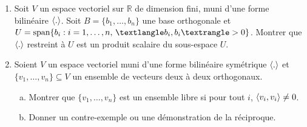 \begin{enumerate}

\item Soit $V$ un espace vectoriel sur $ℝ$ de dimension fini, muni d'une forme bilinéaire $\langle {.} \rangle$. Soit $B = \{b_1,\dots,b_n\}$ une base orthogonale et  $U = \spa \{ b_i :  i=1,\dots,n, \, 〈b_i,b_i〉 >0\}$. Montrer que $\langle {.} \rangle$ restreint à $U$ est un produit scalaire du sous-espace $U$. 
\item Soient $V$ un espace vectoriel muni d'une forme bilinéaire symétrique $\langle {.} \rangle$ et $\{v_1,\dots,v_n\} \subseteq V$ un ensemble de
vecteurs deux à deux orthogonaux. 
  \begin{enumerate}[a)]
  \item   Montrer que $\{v_1,\dots,v_n\}$ est un ensemble libre si pour tout $i$, 
 $\langle {v_i,v_i} \rangle \neq  0$.  
\item  Donner un contre-exemple ou une démonstration de la réciproque. 
\end{enumerate}



\end{enumerate}
